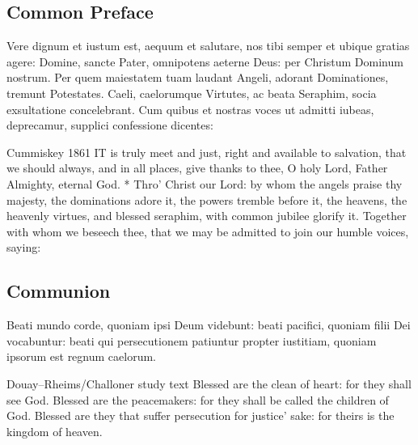 \subsection{Common Preface}
\label{proper-preface}
\begin{latinproper}
Vere dignum et iustum est, aequum et salutare, nos tibi semper et ubique gratias agere: Domine, sancte Pater, omnipotens aeterne Deus: per Christum Dominum nostrum. Per quem maiestatem tuam laudant Angeli, adorant Dominationes, tremunt Potestates. Caeli, caelorumque Virtutes, ac beata Seraphim, socia exsultatione concelebrant. Cum quibus et nostras voces ut admitti iubeas, deprecamur, supplici confessione dicentes:
\end{latinproper}
\begin{englishwitness}{Cummiskey 1861}
IT is truly meet and just, right and available to salvation, that we should always, and in all places, give thanks to thee, O holy Lord, Father Almighty, eternal God. * Thro' Christ our Lord: by whom the angels praise thy majesty, the dominations adore it, the powers tremble before it, the heavens, the heavenly virtues, and blessed seraphim, with common jubilee glorify it. Together with whom we beseech thee, that we may be admitted to join our humble voices, saying:
\end{englishwitness}

\subsection{Communion}
\label{proper-communion}
\begin{latinproper}
Beati mundo corde, quoniam ipsi Deum videbunt: beati pacifici, quoniam filii Dei vocabuntur: beati qui persecutionem patiuntur propter iustitiam, quoniam ipsorum est regnum caelorum.
\end{latinproper}
\begin{englishwitness}{Douay--Rheims/Challoner study text}
Blessed are the clean of heart: for they shall see God. Blessed are the peacemakers: for they shall be called the children of God. Blessed are they that suffer persecution for justice’ sake: for theirs is the kingdom of heaven.
\end{englishwitness}

